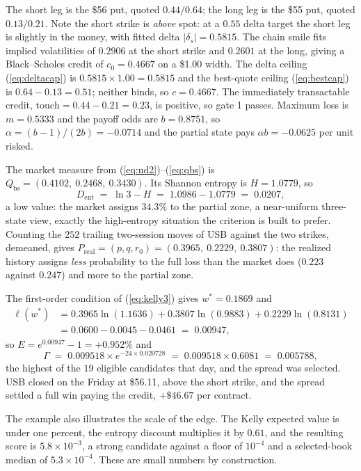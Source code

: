 \documentclass[11pt]{article}
\newcommand{\dent}{D_{\mathrm{ent}}}
\newcommand{\Preal}{P_{\mathrm{real}}}
\newcommand{\Qbs}{Q_{\mathrm{bs}}}
\begin{document}
The short leg is the \$56 put, quoted $0.44/0.64$; the long leg is the \$55
put, quoted $0.13/0.21$. Note the short strike is \emph{above} spot: at a
$0.55$ delta target the short leg is slightly in the money, with fitted delta
$|\delta_s| = 0.5815$. The chain smile fits implied volatilities of $0.2906$
at the short strike and $0.2601$ at the long, giving a Black--Scholes credit of
$c_0 = 0.4667$ on a \$1.00 width. The delta ceiling (\ref{eq:deltacap}) is
$0.5815 \times 1.00 = 0.5815$ and the best-quote ceiling (\ref{eq:bestcap}) is
$0.64 - 0.13 = 0.51$; neither binds, so $c = 0.4667$. The immediately
transactable credit, $\mathrm{touch} = 0.44 - 0.21 = 0.23$, is positive, so
gate 1 passes. Maximum loss is $m = 0.5333$ and the payoff odds are
$b = 0.8751$, so $\alpha = (b-1)/(2b) = -0.0714$ and the partial state pays
$\alpha b = -0.0625$ per unit risked.

The market measure from (\ref{eq:nd2})--(\ref{eq:qbs}) is
$\Qbs = (0.4102,\ 0.2468,\ 0.3430)$. Its Shannon entropy is $H = 1.0779$, so
\begin{equation*}
\dent \;=\; \ln 3 - H \;=\; 1.0986 - 1.0779 \;=\; 0.0207 ,
\end{equation*}
a low value: the market assigns $34.3\%$ to the partial zone, a near-uniform
three-state view, exactly the high-entropy situation the criterion is built to
prefer. Counting the $252$ trailing two-session moves of USB against the two
strikes, demeaned, gives
$\Preal = (p, q, r_0) = (0.3965,\ 0.2229,\ 0.3807)$: the realized history
assigns \emph{less} probability to the full loss than the market does
($0.223$ against $0.247$) and more to the partial zone.

The first-order condition of (\ref{eq:kelly3}) gives $w^\ast = 0.1869$ and
\begin{align*}
\ell(w^\ast) &= 0.3965\ln(1.1636) + 0.3807\ln(0.9883) + 0.2229\ln(0.8131)\\
&= 0.0600 - 0.0045 - 0.0461 \;=\; 0.00947 ,
\end{align*}
so $E = e^{0.00947} - 1 = +0.952\%$ and
\begin{equation*}
\Gamma \;=\; 0.009518 \times e^{-24 \times 0.020728}
\;=\; 0.009518 \times 0.6081 \;=\; 0.005788 ,
\end{equation*}
the highest of the $19$ eligible candidates that day, and the spread was
selected. USB closed
on the Friday at \$56.11, above the short strike, and the spread settled a
full win paying the credit, $+\$46.67$ per contract.

The example also illustrates the scale of the edge. The Kelly expected value
is under one percent, the entropy discount multiplies it by $0.61$, and the
resulting score is $5.8 \times 10^{-3}$, a strong candidate against a floor of
$10^{-4}$ and a selected-book median of $5.3\times10^{-4}$. These are small
numbers by construction.
\end{document}
